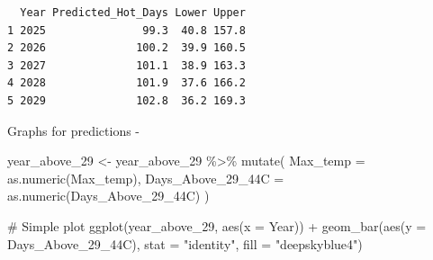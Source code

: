 \documentclass[
  letterpaper,
  DIV=11,
  numbers=noendperiod]{scrreprt}
\newenvironment{Shaded}{\begin{snugshade}}{\end{snugshade}}
\newcommand{\AttributeTok}[1]{\textcolor[rgb]{0.40,0.45,0.13}{#1}}
\newcommand{\CommentTok}[1]{\textcolor[rgb]{0.37,0.37,0.37}{#1}}
\newcommand{\DecValTok}[1]{\textcolor[rgb]{0.68,0.00,0.00}{#1}}
\newcommand{\FunctionTok}[1]{\textcolor[rgb]{0.28,0.35,0.67}{#1}}
\newcommand{\NormalTok}[1]{\textcolor[rgb]{0.00,0.23,0.31}{#1}}
\newcommand{\OtherTok}[1]{\textcolor[rgb]{0.00,0.23,0.31}{#1}}
\newcommand{\SpecialCharTok}[1]{\textcolor[rgb]{0.37,0.37,0.37}{#1}}
\newcommand{\StringTok}[1]{\textcolor[rgb]{0.13,0.47,0.30}{#1}}
\begin{document}
\begin{Shaded}
\end{Shaded}

\begin{verbatim}
  Year Predicted_Hot_Days Lower Upper
1 2025               99.3  40.8 157.8
2 2026              100.2  39.9 160.5
3 2027              101.1  38.9 163.3
4 2028              101.9  37.6 166.2
5 2029              102.8  36.2 169.3
\end{verbatim}

Graphs for predictions -

\begin{Shaded}
\begin{Highlighting}[]
\NormalTok{year\_above\_29 }\OtherTok{\textless{}{-}}\NormalTok{ year\_above\_29 }\SpecialCharTok{\%\textgreater{}\%}
  \FunctionTok{mutate}\NormalTok{(}
    \AttributeTok{Max\_temp =} \FunctionTok{as.numeric}\NormalTok{(Max\_temp),}
    \AttributeTok{Days\_Above\_29\_44C =} \FunctionTok{as.numeric}\NormalTok{(Days\_Above\_29\_44C)}
\NormalTok{  )}

\CommentTok{\# Simple plot}
\FunctionTok{ggplot}\NormalTok{(year\_above\_29, }\FunctionTok{aes}\NormalTok{(}\AttributeTok{x =}\NormalTok{ Year)) }\SpecialCharTok{+}
  \FunctionTok{geom\_bar}\NormalTok{(}\FunctionTok{aes}\NormalTok{(}\AttributeTok{y =}\NormalTok{ Days\_Above\_29\_44C), }\AttributeTok{stat =} \StringTok{"identity"}\NormalTok{, }\AttributeTok{fill =} \StringTok{"deepskyblue4"}\NormalTok{) }
\end{Highlighting}
\end{Shaded}
\end{document}
